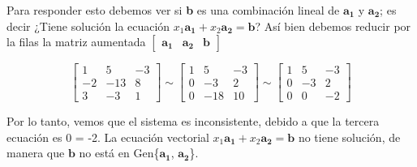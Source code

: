 \documentclass{article}
\begin{document}
Para responder esto debemos ver si \textbf{b} es una combinación lineal de $\mathbf{a_1}$ y $\mathbf{a_2}$; es decir ¿Tiene solución la ecuación $x_1\mathbf{a_1} + x_2\mathbf{a_2} = \mathbf{b}$? Así bien debemos reducir por la filas la matriz aumentada $\begin{bmatrix} \mathbf{a_1} & \mathbf{a_2} & \mathbf{b} \end{bmatrix}$

\begin{equation*}
    \left[\begin{array}{rrr}
    1 & 5 & -3 \\
    -2 & -13 & 8 \\
    3 & -3 & 1
    \end{array}\right] \sim\left[\begin{array}{rrr}
    1 & 5 & -3 \\
    0 & -3 & 2 \\
    0 & -18 & 10
    \end{array}\right] \sim\left[\begin{array}{rrr}
    1 & 5 & -3 \\
    0 & -3 & 2 \\
    0 & 0 & -2
    \end{array}\right]
\end{equation*}

Por lo tanto, vemos que el sistema es inconsistente, debido a que la tercera ecuación es  0 = -2. La ecuación vectorial $x_1\mathbf{a_1} + x_2\mathbf{a_2} = \mathbf{b}$ no tiene solución, de manera que $\mathbf{b}$ no está en Gen\{$\mathbf{a_1}$, $\mathbf{a_2}$\}. \cite{DavidC}

\pagebreak

\end{document}
